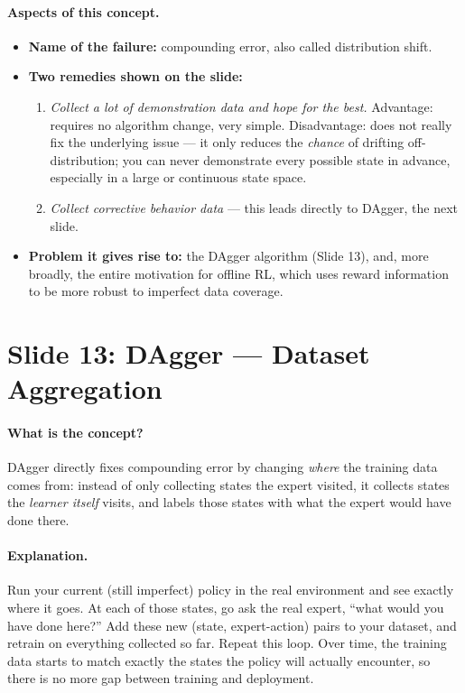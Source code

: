 \documentclass[11pt]{article}
\begin{document}
\paragraph{Aspects of this concept.}
\begin{itemize}
\item \textbf{Name of the failure:} compounding error, also called distribution shift.
\item \textbf{Two remedies shown on the slide:}
\begin{enumerate}
\item \emph{Collect a lot of demonstration data and hope for the best.} Advantage:
requires no algorithm change, very simple. Disadvantage: does not really fix the
underlying issue --- it only reduces the \emph{chance} of drifting off-distribution; you
can never demonstrate every possible state in advance, especially in a large or
continuous state space.
\item \emph{Collect corrective behavior data} --- this leads directly to DAgger, the
next slide.
\end{enumerate}
\item \textbf{Problem it gives rise to:} the DAgger algorithm (Slide 13), and, more
broadly, the entire motivation for offline RL, which uses reward information to be more
robust to imperfect data coverage.
\end{itemize}

\section{Slide 13: DAgger --- Dataset Aggregation}

\paragraph{What is the concept?}
DAgger directly fixes compounding error by changing \emph{where} the training data comes
from: instead of only collecting states the expert visited, it collects states the
\emph{learner itself} visits, and labels those states with what the expert would have
done there.

\paragraph{Explanation.}
Run your current (still imperfect) policy in the real environment and see exactly where
it goes. At each of those states, go ask the real expert, ``what would you have done
here?'' Add these new (state, expert-action) pairs to your dataset, and retrain on
everything collected so far. Repeat this loop. Over time, the training data starts to
match exactly the states the policy will actually encounter, so there is no more gap
between training and deployment.
\end{document}
